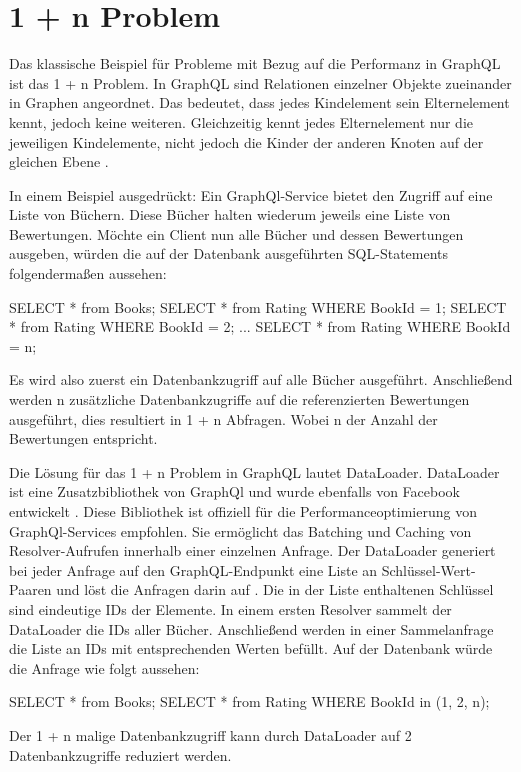 \section{1 + n Problem}
Das klassische Beispiel für Probleme mit Bezug auf die Performanz in GraphQL ist das 1 + n Problem.
In GraphQL sind Relationen einzelner Objekte zueinander in Graphen angeordnet.
Das bedeutet, dass jedes Kindelement sein Elternelement kennt, jedoch keine weiteren.
Gleichzeitig kennt jedes Elternelement nur die jeweiligen Kindelemente, nicht jedoch die Kinder der anderen Knoten auf der gleichen Ebene \cite[S. 104-105]{kress2020graphql}.
\newline

In einem Beispiel ausgedrückt: Ein GraphQl-Service bietet den Zugriff auf eine Liste von Büchern.
Diese Bücher halten wiederum jeweils eine Liste von Bewertungen.
Möchte ein Client nun alle Bücher und dessen Bewertungen ausgeben, würden die auf der Datenbank ausgeführten SQL-Statements folgendermaßen aussehen:
\begin{JsCode}
SELECT * from Books;
SELECT * from Rating WHERE BookId = 1;
SELECT * from Rating WHERE BookId = 2;
...
SELECT * from Rating WHERE BookId = n;
\end{JsCode}

Es wird also zuerst ein Datenbankzugriff auf alle Bücher ausgeführt.
Anschließend werden n zusätzliche Datenbankzugriffe auf die referenzierten Bewertungen ausgeführt, dies resultiert in 1 + n Abfragen.
Wobei n der Anzahl der Bewertungen entspricht.

Die Lösung für das 1 + n Problem in GraphQL lautet DataLoader.
DataLoader ist eine Zusatzbibliothek von GraphQl und wurde ebenfalls von Facebook entwickelt \cite[S. 105]{kress2020graphql}.
Diese Bibliothek ist offiziell für die Performanceoptimierung von GraphQl-Services empfohlen.
Sie ermöglicht das Batching und Caching von Resolver-Aufrufen innerhalb einer einzelnen Anfrage.
Der DataLoader generiert bei jeder Anfrage auf den GraphQL-Endpunkt eine Liste an Schlüssel-Wert-Paaren und löst die Anfragen darin auf \cite[S. 105]{kress2020graphql}.
Die in der Liste enthaltenen Schlüssel sind eindeutige IDs der Elemente.
In einem ersten Resolver sammelt der DataLoader die IDs aller Bücher.
Anschließend werden in einer Sammelanfrage die Liste an IDs mit entsprechenden Werten befüllt.
Auf der Datenbank würde die Anfrage wie folgt aussehen:

\begin{JsCode}
SELECT * from Books;
SELECT * from Rating WHERE BookId in (1, 2, n);
\end{JsCode}

Der 1 + n malige Datenbankzugriff kann durch DataLoader auf 2 Datenbankzugriffe reduziert werden.